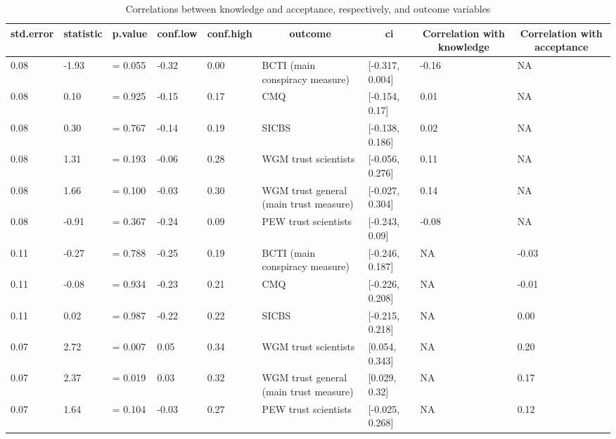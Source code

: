 \documentclass[
  doc,floatsintext]{apa6}
\begin{document}
\begin{table}[tbp]

\begin{center}
\begin{threeparttable}

\caption{\label{tab:exp3-correlations-outcomes}Correlations between knowledge and acceptance, respectively, and outcome variables}

\begin{tabular}{lllllllll}
\toprule
std.error & \multicolumn{1}{c}{statistic} & \multicolumn{1}{c}{p.value} & \multicolumn{1}{c}{conf.low} & \multicolumn{1}{c}{conf.high} & \multicolumn{1}{c}{outcome} & \multicolumn{1}{c}{ci} & \multicolumn{1}{c}{Correlation with knowledge} & \multicolumn{1}{c}{Correlation with acceptance}\\
\midrule
0.08 & -1.93 & = 0.055 & -0.32 & 0.00 & BCTI 
(main conspiracy measure) & {}[-0.317, 0.004] & -0.16 & NA\\
0.08 & 0.10 & = 0.925 & -0.15 & 0.17 & CMQ & {}[-0.154, 0.17] & 0.01 & NA\\
0.08 & 0.30 & = 0.767 & -0.14 & 0.19 & SICBS & {}[-0.138, 0.186] & 0.02 & NA\\
0.08 & 1.31 & = 0.193 & -0.06 & 0.28 & WGM trust scientists & {}[-0.056, 0.276] & 0.11 & NA\\
0.08 & 1.66 & = 0.100 & -0.03 & 0.30 & WGM trust general 
(main trust measure) & {}[-0.027, 0.304] & 0.14 & NA\\
0.08 & -0.91 & = 0.367 & -0.24 & 0.09 & PEW trust scientists & {}[-0.243, 0.09] & -0.08 & NA\\
0.11 & -0.27 & = 0.788 & -0.25 & 0.19 & BCTI 
(main conspiracy measure) & {}[-0.246, 0.187] & NA & -0.03\\
0.11 & -0.08 & = 0.934 & -0.23 & 0.21 & CMQ & {}[-0.226, 0.208] & NA & -0.01\\
0.11 & 0.02 & = 0.987 & -0.22 & 0.22 & SICBS & {}[-0.215, 0.218] & NA & 0.00\\
0.07 & 2.72 & = 0.007 & 0.05 & 0.34 & WGM trust scientists & {}[0.054, 0.343] & NA & 0.20\\
0.07 & 2.37 & = 0.019 & 0.03 & 0.32 & WGM trust general 
(main trust measure) & {}[0.029, 0.32] & NA & 0.17\\
0.07 & 1.64 & = 0.104 & -0.03 & 0.27 & PEW trust scientists & {}[-0.025, 0.268] & NA & 0.12\\
\bottomrule
\end{tabular}

\end{threeparttable}
\end{center}

\end{table}
\end{document}
